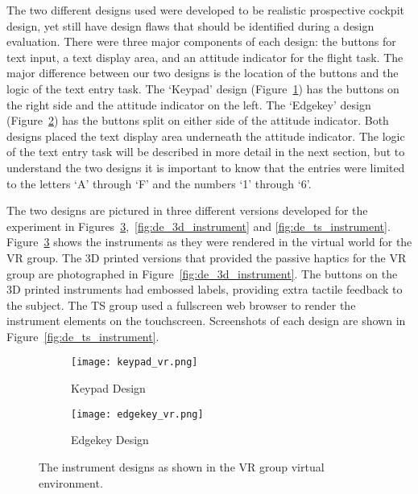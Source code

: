 The two different designs used were developed to be realistic prospective cockpit design, yet still have design flaws that should be identified during a design evaluation.
There were three major components of each design: the buttons for text input, a text display area, and an attitude indicator for the flight task.
The major difference between our two designs is the location of the buttons and the logic of the text entry task.
The `Keypad' design (Figure~\ref{fig:de_vr_instrument:keypad}) has the buttons on the right side and the attitude indicator on the left.
The `Edgekey' design (Figure~\ref{fig:de_vr_instrument:edgekey}) has the buttons split on either side of the attitude indicator.
Both designs placed the text display area underneath the attitude indicator.
The logic of the text entry task will be described in more detail in the next section, but to understand the two designs it is important to know that the entries were limited to the letters `A' through `F' and the numbers `1' through `6'.


The two designs are pictured in three different versions developed for the experiment in Figures~\ref{fig:de_vr_instrument},~\ref{fig:de_3d_instrument} and \ref{fig:de_ts_instrument}.
Figure~\ref{fig:de_vr_instrument} shows the instruments as they were rendered in the virtual world for the VR group.
The 3D printed versions that provided the passive haptics for the VR group are photographed in Figure~\ref{fig:de_3d_instrument}.
The buttons on the 3D printed instruments had embossed labels, providing extra tactile feedback to the subject.
The TS group used a fullscreen web browser to render the instrument elements on the touchscreen.
Screenshots of each design are shown in Figure~\ref{fig:de_ts_instrument}.

\begin{figure}
    \centering
    \begin{subfigure}[t]{0.95\linewidth}
        \centering
        \texttt{[image: keypad\_vr.png]}
        \caption{Keypad Design}
        \label{fig:de_vr_instrument:keypad}
    \end{subfigure}
    \begin{subfigure}[t]{0.95\linewidth}
        \centering
        \texttt{[image: edgekey\_vr.png]}
        \caption{Edgekey Design}
        \label{fig:de_vr_instrument:edgekey}
    \end{subfigure}
    \caption{The instrument designs as shown in the VR group virtual environment.}
    \label{fig:de_vr_instrument}
\end{figure}

